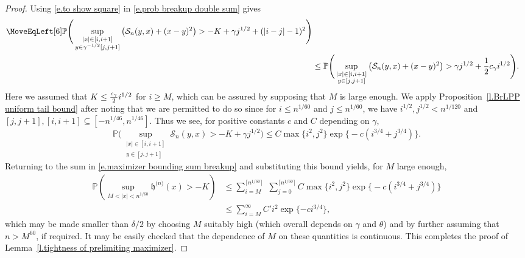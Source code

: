 \documentclass[oneside,final,11pt]{amsart}
\newtheorem{lemma}[thm]{Lemma}
\theoremstyle{definition}
\newcounter{assum}
\newcommand{\fh}{\mathfrak{h}}
\newcommand{\h}{\fh^{{\scriptscriptstyle(}n{\scriptscriptstyle)}}}
\newcommand{\CS}{\mathcal{S}}
\renewcommand{\S}{\CS}
\newcommand{\1}[1]{\mathbf{1}_{#1}}
\renewcommand{\P}{\mathbb P}
\numberwithin{equation}{section}
\begin{document}
\begin{proof}
%
%

Using \eqref{e.to show square} in \eqref{e.prob breakup double sum} gives
%
\begin{align*}
\MoveEqLeft[6]
\P\Bigg(\sup_{\substack{|x|\in [i,i+1]\\ y\in \gamma^{-1/2}[j,j+1]}}\left(\S_n(y, x) + (x-y)^2\right) > -K + \gamma j^{1/2} + (|i-j|-1)^2\Bigg)\\
%
&\leq \P\Bigg(\sup_{\substack{|x|\in [i,i+1]\\ y\in [j,j+1]}}\left(\S_n(y, x) + (x-y)^2\right) > \gamma j^{1/2} + \frac{1}{2}c_\gamma i^{1/2}\Bigg).
\end{align*}
%
Here we assumed that $K \leq \smash{\frac{c_\gamma}{2}i^{1/2}}$ for $i\geq M$, which can be assured by supposing that $M$ is large enough.
%
We apply Proposition~\ref{l.BrLPP uniform tail bound} after noting that we are permitted to do so since for $i \leq n^{1/60}$ and $j\leq n^{1/60}$, we have $i^{1/2}, j^{1/2} < n^{1/120}$ and $[j,j+1],[i, i+1] \subseteq [-n^{1/46}, n^{1/46}]$. Thus we see, for positive constants $c$ and $C$ depending on $\gamma$,
%
$$\P\Bigg(\sup_{\substack{|x|\in [i,i+1]\\ y\in [j,j+1]}}\S_n(y, x) > -K+ \gamma j^{1/2}\Bigg) \leq C\max \{ i^2, j^2\} \exp \big\{ -c(i^{3/4}+ j^{3/4}) \big\}.$$
%
Returning to the sum in \eqref{e.maximizer bounding sum breakup} and substituting this bound yields, for $M$ large enough,
%
\begin{align*}
\P\left(\sup_{M<|x|<n^{1/60}} \h(x) > -K\right)
%
&\leq \sum_{i=M}^{\lceil n^{1/60}\rceil}\,\,\sum_{j=0}^{\lceil n^{1/60}\rceil} C\max \{ i^2, j^2 \} \exp \big\{ -c(i^{3/4}+ j^{3/4}) \big\}\\
%
&\leq \sum_{i=M}^{\infty} C'i^2\exp \{ -ci^{3/4} \} ,
\end{align*}
%
which may be made smaller than $\delta/2$ by choosing $M$ suitably high (which overall depends on $\gamma$ and $\theta$)
 and by further assuming that $n> M^{60}$, if required. It may be easily checked that the dependence of $M$ on these quantities is continuous. This completes the proof of Lemma~\ref{l.tightness of prelimiting maximizer}.
\end{proof}
\end{document}
